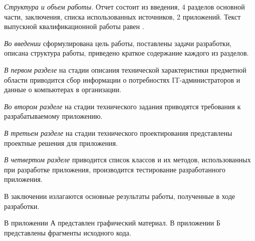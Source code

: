 \emph{Структура и объем работы.} Отчет состоит из введения, 4 разделов основной части, заключения, списка использованных источников, 2 приложений. Текст выпускной квалификационной работы равен .

\emph{Во введении} сформулирована цель работы, поставлены задачи разработки, описана структура работы, приведено краткое содержание каждого из разделов.

\emph{В первом разделе} на стадии описания технической характеристики предметной области приводится сбор информации о потребностях IT-администраторов и данные о компьютерах в организации.

\emph{Во втором разделе} на стадии технического задания приводятся требования к разрабатываемому приложению.

\emph{В третьем разделе} на стадии технического проектирования представлены проектные решения для приложения.

\emph{В четвертом разделе} приводится список классов и их методов, использованных при разработке приложения, производится тестирование разработанного приложения.

В заключении излагаются основные результаты работы, полученные в ходе разработки.

В приложении А представлен графический материал.
В приложении Б представлены фрагменты исходного кода. 
